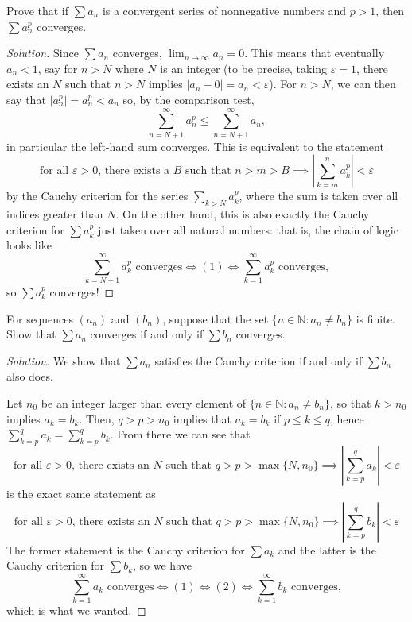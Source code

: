 \documentclass[11pt]{scrartcl}
\providecommand{\eps}{\varepsilon}
\providecommand{\NN}{\mathbb N}
\theoremstyle{problem}
\newenvironment{problem}[1]
{\renewcommand\theinnercustomthm{#1}\innercustomthm}
{\endinnercustomthm}
\theoremstyle{remark}
\newenvironment{soln}{\begin{proof}[Solution]}{\end{proof}}
\providecommand{\abs}[1]{\left|#1\right|}
\begin{document}
\pagebreak
\begin{problem}{14.7}
	Prove that if $\sum a_n$ is a convergent series of nonnegative numbers
	and $p > 1$, then $\sum a_n^p$ converges.
\end{problem}

\begin{soln}
	Since $\sum a_n$ converges, $\lim_{n\to\infty} a_n = 0$.
	This means that eventually $a_n < 1$, say for $n > N$
	where $N$ is an integer
	(to be precise, taking $\eps = 1$, there exists an $N$
	such that $n > N$ implies $|a_n - 0| = a_n < \eps$).
	For $n > N$, we can then say that $|a_n^p| = a_n^p < a_n$
	so, by the comparison test,
	\[\sum_{n = N+1}^\infty a_n^p \le \sum_{n=N+1}^\infty a_n,\]
	in particular the left-hand sum converges.
	This is equivalent to the statement
	\begin{equation}
		\text{for all $\eps > 0$, there exists a $B$ such that }
		n > m > B \implies \abs{\sum_{k=m}^n a_k^p} < \eps
	\end{equation}
	by the Cauchy criterion for the series $\sum_{k > N} a_k^p$,
	where the sum is taken over all indices greater than $N$.
	On the other hand, this is also exactly the Cauchy criterion
	for $\sum a_k^p$ just taken over all natural numbers:
	that is, the chain of logic looks like
	\[\sum_{k=N+1}^\infty a_k^p\text{ converges} \iff (1) \iff
	\sum_{k=1}^\infty a_k^p \text{ converges},\]
	so $\sum a_k^p$ converges!
\end{soln}

\begin{problem}{14.9}
	For sequences $(a_n)$ and $(b_n)$, suppose that the set
	$\{n\in\NN : a_n\ne b_n\}$ is finite. Show that $\sum a_n$
	converges if and only if $\sum b_n$ converges.
\end{problem}

\begin{soln}
	We show that $\sum a_n$ satisfies the Cauchy criterion if and only if
	$\sum b_n$ also does.
	
	Let $n_0$ be an integer larger than every element of
	$\{n\in\NN: a_n\ne b_n\}$, so that $k > n_0$ implies $a_k = b_k$.
	Then, $q > p > n_0$ implies that $a_k = b_k$ if $p\le k\le q$,
	hence $\sum_{k=p}^q a_k = \sum_{k=p}^q b_k$.
	From there we can see that
	\begin{equation}
		\text{for all $\eps > 0$, there exists an $N$ such that }
		q > p > \max\{N, n_0\} \implies \abs{\sum_{k=p}^q a_k} < \eps
	\end{equation}
	is the exact same statement as
	\begin{equation}
		\text{for all $\eps > 0$, there exists an $N$ such that }
		q > p > \max\{N, n_0\} \implies \abs{\sum_{k=p}^q b_k} < \eps
	\end{equation}
	The former statement is the Cauchy criterion for $\sum a_k$
	and the latter is the Cauchy criterion for $\sum b_k$,
	so we have
	\[\sum_{k=1}^\infty a_k\text{ converges} \iff (1) \iff (2) \iff
	\sum_{k=1}^\infty b_k\text{ converges},\]
	which is what we wanted.
\end{soln}
\end{document}
